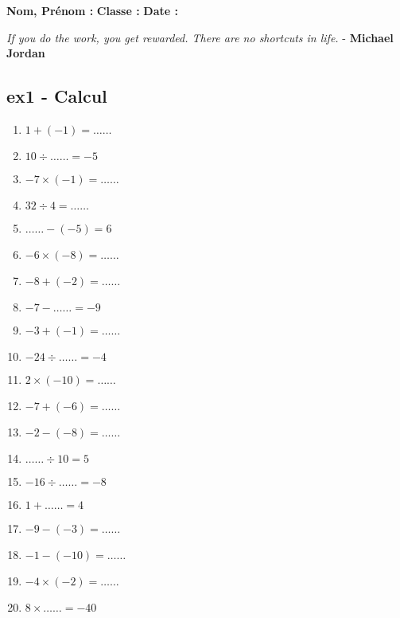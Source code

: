\documentclass[12pt]{article}
\begin{document}
\newcommand{\Pointilles}[1][3]{%
  \multido{}{#1}{\makebox[\linewidth]{\dotfill}\\[\parskip]
}}

\setlength{\columnseprule}{1pt}

\textbf{Nom, Prénom :} \hspace{8cm} \textbf{Classe :} \hspace{3cm} \textbf{Date :}\\

\begin{center}
  \textit{If you do the work, you get rewarded. There are no shortcuts in life.}  - \textbf{Michael Jordan}
\end{center}


\subsection*{ex1 - Calcul}

\begin{multicols}{3}\noindent

  \begin{enumerate}
  \item $1 + \left( -1\right) = \ldots\ldots$
  \item $10 \div \ldots\ldots = -5$
  \item $-7 \times \left( -1\right) = \ldots\ldots$
  \item $32 \div 4 = \ldots\ldots$
  \item $\ldots\ldots - \left( -5\right) = 6$
  \item $-6 \times \left( -8\right) = \ldots\ldots$
  \item $-8 + \left( -2\right) = \ldots\ldots$
  \item $-7 - \ldots\ldots = -9$
  \item $-3 + \left( -1\right) = \ldots\ldots$
  \item $-24 \div \ldots\ldots = -4$
  \item $2 \times \left( -10\right) = \ldots\ldots$
  \item $-7 + \left( -6\right) = \ldots\ldots$
  \item $-2 - \left( -8\right) = \ldots\ldots$
  \item $\ldots\ldots \div 10 = 5$
  \item $-16 \div \ldots\ldots = -8$
  \item $1 + \ldots\ldots = 4$
  \item $-9 - \left( -3\right) = \ldots\ldots$
  \item $-1 - \left( -10\right) = \ldots\ldots$
  \item $-4 \times \left( -2\right) = \ldots\ldots$
  \item $8 \times \ldots\ldots = -40$
  \end{enumerate}
  
\end{multicols}
\end{document}
